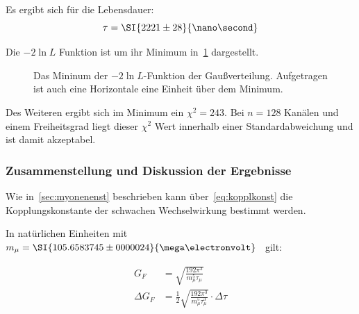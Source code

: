 \documentclass[slug=LM, room=Andreas-Schubert-Bau\,\ K\ 1A, supervisor=Anne-Sophie\ Berthold, coursedate=13.\ 12.\ 2019]{../../Lab_Report_LaTeX/lab_report}
\begin{document}
Es ergibt sich f\"ur die Lebensdauer:
\begin{equation}
  \label{eq:result-poisson}
  \tau = \SI{2221\pm 28}{\nano\second}
\end{equation}

Die \(-2\ln{L}\) Funktion ist um ihr Minimum
in~\ref{fig:haupt-poisson} dargestellt.

\begin{figure}[h]\centering
  
  \caption{Das Mininum der \(-2\ln{L}\)-Funktion der
    Gaußverteilung. Aufgetragen ist auch eine Horizontale eine
    Einheit \"uber dem Minimum.}
  \label{fig:haupt-poisson}
\end{figure}

Des Weiteren ergibt sich im Minimum ein \(\chi^2=243\). Bei \(n=128\)
Kan\"alen und einem Freiheitsgrad liegt dieser \(\chi^2\) Wert
innerhalb einer Standardabweichung und ist damit akzeptabel.


\subsubsection{Zusammenstellung und Diskussion der Ergebnisse}
\label{sec:disk}

Wie in~\ref{sec:myonenenst} beschrieben kann
\"uber~\ref{eq:kopplkonst} die Kopplungskonstante der schwachen
Wechselwirkung bestimmt werden.

In nat\"urlichen Einheiten mit
\(m_\mu = \SI{105.6583745\pm
  0000024}{\mega\electronvolt}\)~\cite{codata} gilt:

\begin{align}
  \label{eq:couplingconstant}
  G_F &= \sqrt{\frac{192\pi^3}{m_\mu^5\tau_\mu}} \\
  \Delta G_F &=
  \frac{1}{2}\sqrt{\frac{192\pi^3}{m_\mu^5\tau_\mu^3}}\cdot \Delta \tau
\end{align}
\end{document}
